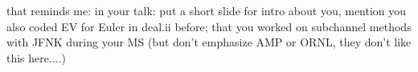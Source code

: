 that reminds me: in your talk: put a short slide for intro about you, mention
you also coded EV for Euler in deal.ii before; that you worked on subchannel
methods with JFNK during your MS (but don't emphasize AMP or ORNL, they don't
like this here....)
